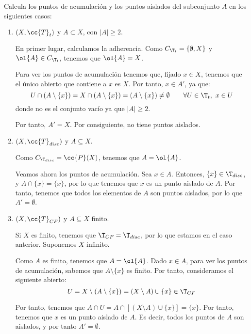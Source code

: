 \begin{ejercicio}
    Calcula los puntos de acumulación y los puntos aislados del subconjunto $A$ en los siguientes casos:
    \begin{enumerate}
        \item $(X,\cc{T}_t)$ y $A\subset X$, con $|A|\geq 2$.

        En primer lugar, calculamos la adherencia. Como $C_{\T_t}=\{\emptyset,X\}$ y $\ol{A}\in C_{\T_t}$, tenemos que $\ol{A}=X$.

        Para ver los puntos de acumulación tenemos que, fijado $x\in X$, tenemos que el único abierto que contiene a $x$ es $X$. Por tanto, $x\in A'$, ya que:
        \begin{equation*}
            U\cap (A\setminus \{x\})
            = X\cap (A\setminus \{x\})
            = (A\setminus \{x\})
            \neq \emptyset \qquad \forall U\in \T_t,~x\in U
        \end{equation*}
        donde no es el conjunto vacío ya que $|A|\geq 2$.

        Por tanto, $A'=X$. Por consiguiente, no tiene puntos aislados.
        
        \item $(X,\cc{T}_{disc})$ y $A\subseteq X$.

        Como $C_{\T_{disc}}=\cc{P}(X)$, tenemos que $A=\ol{A}$.

        Veamos ahora los puntos de acumulación. Sea $x\in A$. Entonces, $\{x\}\in \T_{disc}$, y $A\cap \{x\}=\{x\}$, por lo que tenemos que $x$ es un punto aislado de $A$. Por tanto, tenemos que todos los elementos de $A$ son puntos aislados, por lo que $A'=\emptyset$.
        
        \item $(X,\cc{T}_{CF})$ y $A\subseteq X$ finito.

        Si $X$ es finito, tenemos que $\T_{CF}=\T_{disc}$, por lo que estamos en el caso anterior. Suponemos $X$ infinito.
        
        Como $A$ es finito, tenemos que $A=\ol{A}$. Dado $x\in A$, para ver los puntos de acumulación, sabemos que $A\setminus \{x\}$ es finito. Por tanto, consideramos el siguiente abierto:
        \begin{equation*}
            U=X\setminus (A\setminus \{x\}) = (X\setminus A)\cup \{x\} \in \T_{CF}
        \end{equation*}

        Por tanto, tenemos que $A\cap U=A\cap [(X\setminus A)\cup \{x\}] = \{x\}$. Por tanto, tenemos que $x$ es un punto aislado de $A$. Es decir, todos los puntos de $A$ son aislados, y por tanto $A'=\emptyset$.
        

\end{enumerate}
\end{ejercicio}
